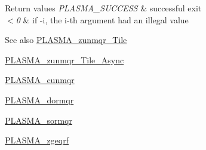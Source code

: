 \begin{DoxyRetVals}{Return values}
{\em P\+L\+A\+S\+M\+A\+\_\+\+S\+U\+C\+C\+E\+S\+S} & successful exit \\
\hline
{\em $<$0} & if -\/i, the i-\/th argument had an illegal value\\
\hline
\end{DoxyRetVals}
\begin{DoxySeeAlso}{See also}
\hyperlink{group__PLASMA__Complex64__t__Tile_ga52c9965e4609c082ae9b976764fdd1c7_ga52c9965e4609c082ae9b976764fdd1c7}{P\+L\+A\+S\+M\+A\+\_\+zunmqr\+\_\+\+Tile} 

\hyperlink{group__PLASMA__Complex64__t__Tile__Async_ga65bce78bfc91e50cd35cdb87521ce9a4_ga65bce78bfc91e50cd35cdb87521ce9a4}{P\+L\+A\+S\+M\+A\+\_\+zunmqr\+\_\+\+Tile\+\_\+\+Async} 

\hyperlink{group__PLASMA__Complex32__t_gac4f6c16a5e7d9bc92ec6addcaa42bad1_gac4f6c16a5e7d9bc92ec6addcaa42bad1}{P\+L\+A\+S\+M\+A\+\_\+cunmqr} 

\hyperlink{group__double_ga9623493d89eb656c0f5aa44c7772294c_ga9623493d89eb656c0f5aa44c7772294c}{P\+L\+A\+S\+M\+A\+\_\+dormqr} 

\hyperlink{group__float_ga3d2c263d860db4a6d63fd13156262bd2_ga3d2c263d860db4a6d63fd13156262bd2}{P\+L\+A\+S\+M\+A\+\_\+sormqr} 

\hyperlink{group__PLASMA__Complex64__t_ga9d4fae8697b364c384faa7480aea3118_ga9d4fae8697b364c384faa7480aea3118}{P\+L\+A\+S\+M\+A\+\_\+zgeqrf} 
\end{DoxySeeAlso}
